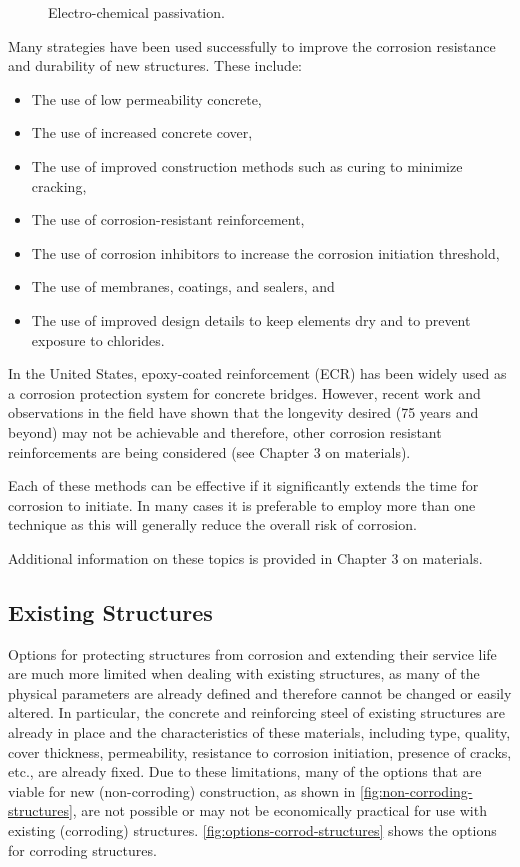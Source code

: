 \begin{figure}
  \caption{Electro-chemical passivation.}
  \label{fig:electro-chemical-passivation}
\end{figure}

Many strategies have been used successfully to improve the corrosion resistance and durability of new structures. These include:
\begin{itemize}
  \item The use of low permeability concrete,
  \item The use of increased concrete cover,
  \item The use of improved construction methods such as curing to minimize cracking,
  \item The use of corrosion-resistant reinforcement,
  \item The use of corrosion inhibitors to increase the corrosion initiation threshold,
  \item The use of membranes, coatings, and sealers, and
  \item The use of improved design details to keep elements dry and to prevent exposure to chlorides.
\end{itemize}

In the United States, epoxy-coated reinforcement (ECR) has been widely used as a corrosion protection system
for concrete bridges. However, recent work and observations in the field have shown that the longevity desired (75
years and beyond) may not be achievable and therefore, other corrosion resistant reinforcements are being considered
(see Chapter 3 on materials).

Each of these methods can be effective if it significantly extends the time for corrosion to initiate. In many cases
it is preferable to employ more than one technique as this will generally reduce the overall risk of corrosion.

Additional information on these topics is provided in Chapter 3 on materials.

\subsection{Existing Structures}
Options for protecting structures from corrosion and extending their service life are much more limited when
dealing with existing structures, as many of the physical parameters are already defined and therefore cannot be
changed or easily altered. In particular, the concrete and reinforcing steel of existing structures are already in place and the characteristics of these materials, including type, quality, cover thickness, permeability, resistance to
corrosion initiation, presence of cracks, etc., are already fixed. Due to these limitations, many of the options that are
viable for new (non-corroding) construction, as shown in \cref{fig:non-corroding-structures}, are not possible or may not be economically
practical for use with existing (corroding) structures. \cref{fig:options-corrod-structures} shows the options for corroding structures.

